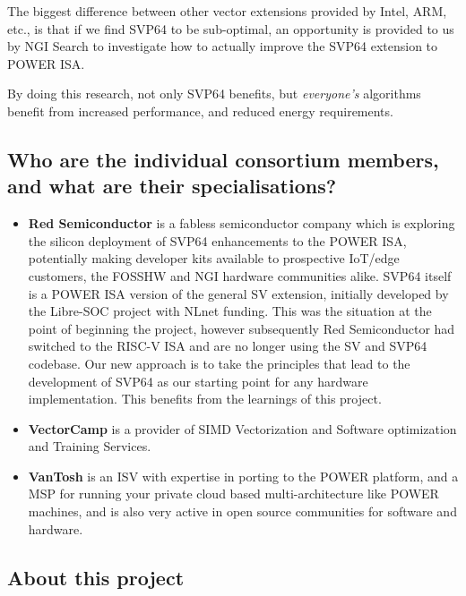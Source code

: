 The biggest difference between other vector extensions provided by Intel,
\acrshort{ARM}, etc., is that if we find \acrshort{SVP64} to be sub-optimal, an opportunity is
provided to us by \acrshort{NGI} Search to investigate how to actually improve the
\acrshort{SVP64} extension to \acrshort{POWER} \acrshort{ISA}.

By doing this research, not only \acrshort{SVP64} benefits, but \textit{everyone's} algorithms
benefit from increased performance, and reduced energy requirements.

\subsection{Who are the individual consortium members, and what are their specialisations?}

\begin{itemize}
  \item \textbf{Red Semiconductor} is a fabless semiconductor company which is
  exploring the silicon deployment of  \acrshort{SVP64} enhancements to the
  \acrshort{POWER} \acrshort{ISA}, potentially making developer kits available
  to prospective \acrfull{IoT}/edge customers, the \acrfull{FOSSHW} and
  \acrshort{NGI} hardware communities alike. \acrshort{SVP64} itself is a
  \acrshort{POWER} ISA version of the general \acrfull{SV} extension, initially
  developed by the Libre-SOC project with NLnet funding. This was the situation
  at the point of beginning the project, however subsequently Red Semiconductor
  had switched to the \acrshort{RISC-V} \acrshort{ISA} and are no longer using the
  \acrshort{SV} and \acrshort{SVP64} codebase.
  Our new approach is to take the principles that lead to the development of
  \acrshort{SVP64} as our starting point for any hardware implementation.
  This benefits from the learnings of this project.
  \item \textbf{VectorCamp} is a provider of \acrfull{SIMD} Vectorization and Software optimization
  and Training Services.
  \item \textbf{VanTosh} is an \acrfull{ISV} with expertise in porting
  to the \acrshort{POWER} platform, and a \acrfull{MSP} for running
  your private cloud based multi-architecture like \acrshort{POWER} machines, and is
  also very active in open source communities for software and hardware.
\end{itemize}

\subsection{About this project}

